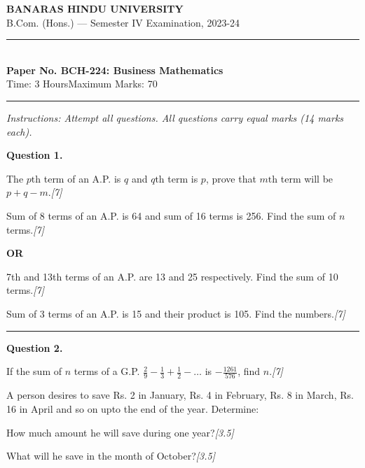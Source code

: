 \documentclass[11pt,a4paper]{article}
\newcommand{\pts}[1]{\hfill   \textit{[#1]}}
\begin{document}
\begin{center}
  {\large\bfseries BANARAS HINDU UNIVERSITY}\\[2pt]
  {\normalsize B.Com. (Hons.) --- Semester IV Examination, 2023-24}\\[6pt]
  \rule{0.8\linewidth}{0.5pt}\\[6pt]
  {\large\bfseries Paper No. BCH-224: Business Mathematics}\\[4pt]
  {\normalsize Time: 3 Hours\hfill Maximum Marks: 70}
\end{center}

\rule{\linewidth}{0.4pt}

\smallskip



\noindent   \textit{Instructions: Attempt all questions. All questions carry equal marks (14 marks each).}

\bigskip




\noindent   \textbf{Question 1.}

\begin{parts}
  \item The $p \text{th}$ term of an A.P. is $q$ and $q \text{th}$ term is $p$, prove that $m \text{th}$ term will be $p+q-m$.\pts{7}
  \item Sum of 8 terms of an A.P. is 64 and sum of 16 terms is 256. Find the sum of $n$ terms.\pts{7}
\end{parts}

\centerline{   \textbf{OR}}


\begin{parts}
  \item 7th and 13th terms of an A.P. are 13 and 25 respectively. Find the sum of 10 terms.\pts{7}
  \item Sum of 3 terms of an A.P. is 15 and their product is 105. Find the numbers.\pts{7}
\end{parts}

\medskip\rule{\linewidth}{0.2pt}




\noindent   \textbf{Question 2.}

\begin{parts}
  \item If the sum of $n$ terms of a G.P. $\frac{2}{9} - \frac{1}{3} + \frac{1}{2} - \dots$ is $-\frac{1261}{576}$, find $n$.\pts{7}
  \item A person desires to save Rs. 2 in January, Rs. 4 in February, Rs. 8 in March, Rs. 16 in April and so on upto the end of the year. Determine:
  
\begin{parts}
    \item How much amount he will save during one year?\pts{3.5}
    \item What will he save in the month of October?\pts{3.5}
  \end{parts}
\end{parts}
\end{document}
